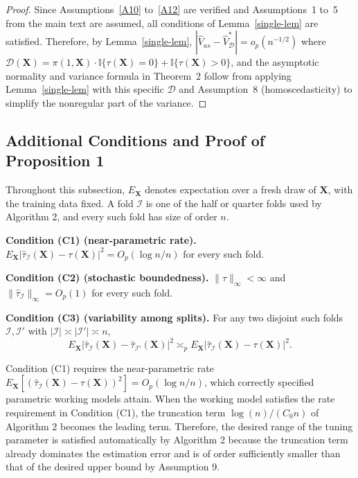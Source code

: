 \documentclass[11pt]{article}
\theoremstyle{referenceplain}
\theoremstyle{referencedefinition}
\theoremstyle{referenceremark}
\newcommand{\tauh}{\widehat{\tau}}
\newcommand{\cI}{\mathcal{I}}
\newcommand{\bX}{\mathbf{X}}
\begin{document}
\begin{proof}
    Since Assumptions~\ref{A10} to~\ref{A12} are verified 
    and Assumptions~1 to~5 from the main text are 
    assumed, all conditions of Lemma~\ref{single-lem} are 
    satisfied. Therefore, by Lemma~\ref{single-lem}, 
    $|\widehat{V}_{as}-\widehat{V}_{\mathcal{D}}^*|
    =o_p(n^{-1/2})$ where 
    $\mathcal{D}(\mathbf{X})=\pi(1,\mathbf{X})\cdot
    \mathbb{I}\{\tau(\mathbf{X})=0\}
    +\mathbb{I}\{\tau(\mathbf{X})>0\}$, 
    and the asymptotic normality and variance formula in 
    Theorem~2 follow from applying 
    Lemma~\ref{single-lem} with this specific $\mathcal{D}$ 
    and Assumption~8 (homoscedasticity) to simplify the 
    nonregular part of the variance.
\end{proof}

\subsection{Additional Conditions and Proof of Proposition 1}
Throughout this subsection, $E_{\mathbf X}$ denotes expectation over a fresh draw of $\mathbf X$, with the training data fixed. A fold $\mathcal I$ is one of the half or quarter folds used by Algorithm 2, and every such fold has size of order $n$.

\medskip\noindent\textbf{Condition (C1) (near-parametric rate).}
$E_{\mathbf X}|\widehat\tau_{\mathcal I}(\mathbf X)-\tau(\mathbf X)|^2=O_p(\log n/n)$ for every such fold.

\medskip\noindent\textbf{Condition (C2) (stochastic boundedness).}
$\|\tau\|_\infty<\infty$ and $\|\widehat\tau_{\mathcal I}\|_\infty=O_p(1)$ for every such fold.

\medskip\noindent\textbf{Condition (C3) (variability among splits).}
For any two disjoint such folds $\mathcal I,\mathcal I'$ with $|\mathcal I|\asymp|\mathcal I'|\asymp n$,
\[
E_{\mathbf X}|\widehat\tau_{\mathcal I}(\mathbf X)-\widehat\tau_{\mathcal I'}(\mathbf X)|^2
\asymp_p E_{\mathbf X}|\widehat\tau_{\mathcal I}(\mathbf X)-\tau(\mathbf X)|^2.
\]

Condition (C1) requires the near-parametric rate $E_{\bX}[(\tauh_{\cI}(\bX)-\tau(\bX))^2]=O_p(\log n/n)$, which correctly specified parametric working models attain. When the working model satisfies the rate requirement in Condition (C1), the truncation term $\log(n)/({C_0}n)$ of Algorithm 2 becomes the leading term. Therefore, the desired range of the tuning parameter is satisfied automatically by Algorithm 2 because the truncation term already dominates the estimation error and is of order sufficiently smaller than that of the desired upper bound by Assumption 9.
\end{document}
